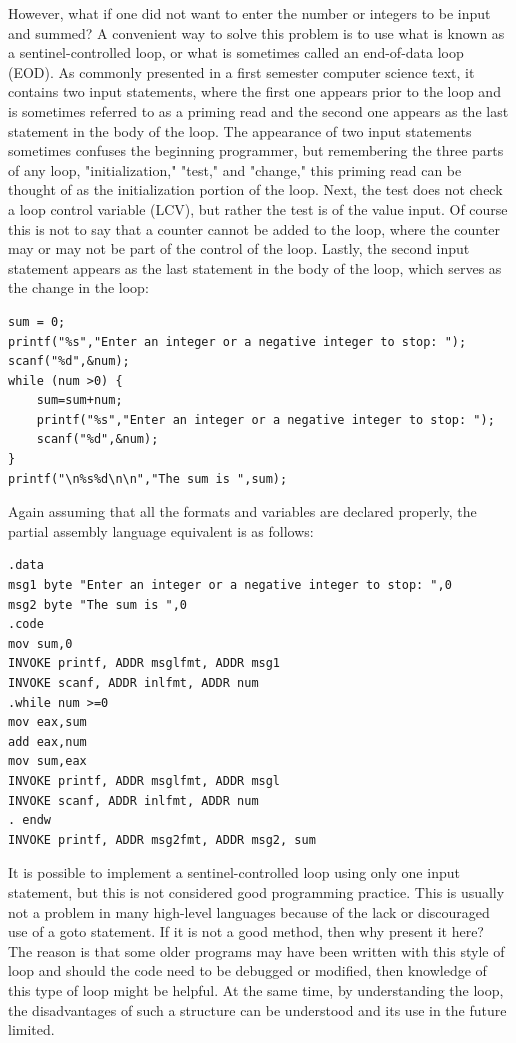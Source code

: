 \documentclass[10pt]{book}
\begin{document}
However, what if one did not want to enter the number or integers to be input and summed? A convenient way to solve this problem is to use what is known as a sentinel-controlled loop, or what is sometimes called an end-of-data loop (EOD). As commonly presented in a first semester computer science text, it contains two input statements, where the first one appears prior to the loop and is sometimes referred to as a priming read and the second one appears as the last statement in the body of the loop. The appearance of two input statements sometimes confuses the beginning programmer, but remembering the three parts of any loop, "initialization," "test," and "change," this priming read can be thought of as the initialization portion of the loop. Next, the test does not check a loop control variable (LCV), but rather the test is of the value input. Of course this is not to say that a counter cannot be added to the loop, where the counter may or may not be part of the control of the loop. Lastly, the second input statement appears as the last statement in the body of the loop, which serves as the change in the loop:


\begin{verbatim}
sum = 0;
printf("%s","Enter an integer or a negative integer to stop: ");
scanf("%d",&num);
while (num >0) {
    sum=sum+num;
    printf("%s","Enter an integer or a negative integer to stop: ");
    scanf("%d",&num);
}
printf("\n%s%d\n\n","The sum is ",sum);
\end{verbatim}

Again assuming that all the formats and variables are declared properly, the partial assembly language equivalent is as follows:

\begin{verbatim}
.data
msg1 byte "Enter an integer or a negative integer to stop: ",0
msg2 byte "The sum is ",0
.code
mov sum,0
INVOKE printf, ADDR msglfmt, ADDR msg1
INVOKE scanf, ADDR inlfmt, ADDR num
.while num >=0
mov eax,sum
add eax,num
mov sum,eax
INVOKE printf, ADDR msglfmt, ADDR msgl
INVOKE scanf, ADDR inlfmt, ADDR num
. endw
INVOKE printf, ADDR msg2fmt, ADDR msg2, sum
\end{verbatim}

It is possible to implement a sentinel-controlled loop using only one input statement, but this is not considered good programming practice. This is usually not a problem in many high-level languages because of the lack or discouraged use of a goto statement. If it is not a good method, then why present it here? The reason is that some older programs may have been written with this style of loop and should the code need to be debugged or modified, then knowledge of this type of loop might be helpful. At the same time, by understanding the loop, the disadvantages of such a structure can be understood and its use in the future limited.
\end{document}
